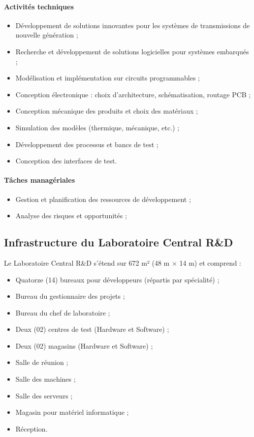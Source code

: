 \paragraph{Activités techniques}
\begin{itemize}
    \item Développement de solutions innovantes pour les systèmes de transmissions de nouvelle génération ;
    \item Recherche et développement de solutions logicielles pour systèmes embarqués ;
    \item Modélisation et implémentation sur circuits programmables ;
    \item Conception électronique : choix d'architecture, schématisation, routage PCB ;
    \item Conception mécanique des produits et choix des matériaux ;
    \item Simulation des modèles (thermique, mécanique, etc.) ;
    \item Développement des processus et bancs de test ;
    \item Conception des interfaces de test.
\end{itemize}

\paragraph{Tâches managériales}
\begin{itemize}
    \item Gestion et planification des ressources de développement ;
    \item Analyse des risques et opportunités ;
\end{itemize}

\subsection{Infrastructure du Laboratoire Central R\&D}
\label{subsec:infra_labo}

Le Laboratoire Central R\&D s’étend sur 672 m² (48 m $\times$ 14 m) et comprend :
\begin{itemize}
    \item Quatorze (14) bureaux pour développeurs (répartis par spécialité) ;
    \item Bureau du gestionnaire des projets ;
    \item Bureau du chef de laboratoire ;
    \item Deux (02) centres de test (Hardware et Software) ;
    \item Deux (02) magasins (Hardware et Software) ;
    \item Salle de réunion ;
    \item Salle des machines ;
    \item Salle des serveurs ;
    \item Magasin pour matériel informatique ;
    \item Réception.
\end{itemize}

